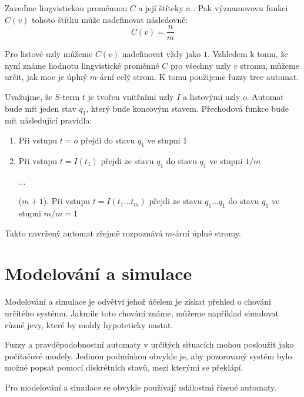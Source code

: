 \documentclass[a4paper,10pt]{article}
\begin{document}
Zaveďme lingvistickou proměnnou $C$  a její štíteky  a . Pak významovovu funkci $C(v)$  tohoto štítku může nadefinovat následovně:
$$
  C(v) = \frac{n}{m}
$$

Pro listové uzly můžeme $C(v)$ nadefinovat vždy jako $1$. Vzhledem k tomu, že nyní známe hodnotu lingvistické proměnné $C$ pro všechny uzly $v$ stromu, můžeme určit, jak moc je úplný $m$-ární celý strom. K tomu použijeme fuzzy tree automat.

Uvažujme, že S-term $t$ je tvořen vnitřními uzly $I$ a listovými uzly $o$. Automat bude mít jeden stav $q_1$, který bude koncovým stavem. Přechodová funkce bude mít následující pravidla:
\begin{enumerate}
 \item Při vstupu $t = o$ přejdi do stavu $q_1$ ve stupni $1$
 \item Při vstupu $t = I(t_1)$ přejdi ze stavu $q_1$ do stavu $q_1$ ve stupni $1/m$
 \item[] $\dots$
 \item[($m + 1$).] Při vstupu $t = I(t_1 \dots t_m)$ přejdi ze stavu $q_1 \dots q_1$ do stavu $q_1$ ve stupni $m/m = 1$
\end{enumerate}

Takto navržený automat zřejmě rozpoznává $m$-ární úplné stromy.


\section{Modelování a simulace}

Modelování a simulace je odvětví jehož účelem je získat přehled o chování určitého systému. Jakmile toto chování známe, můžeme například simulovat různé jevy, které by mohly hypoteticky nastat.

Fuzzy a pravděpodobnostní automaty v určitých situacích mohou posloužit jako počítačové modely. Jedinou podmínkou obvykle je, aby pozorovaný systém bylo možné popsat pomocí diskrétních stavů, mezi kterými se překlápí. 

Pro modelování a simulace se obvykle používají událostmi řízené automaty.

\end{document}
